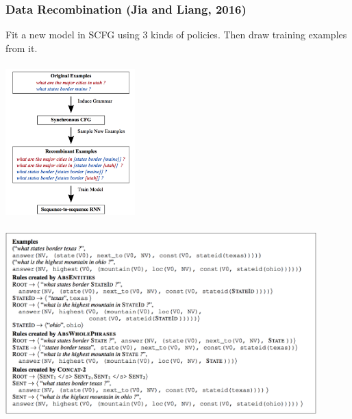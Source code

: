 \documentclass{beamer}
\begin{document}
\begin{frame}
    \frametitle{Data Recombination (Jia and Liang, 2016)}

     {
        Fit a new model in SCFG using 3 kinds of policies.
        Then draw training examples from it.

        \begin{center}
            \includegraphics[width=5cm,height=6cm]{img/data-recombinant-system.png}
        \end{center}
    }
     {
        \begin{center}
            \includegraphics[width=12cm,height=7cm]{img/data-recombinant-example.png}
        \end{center}
    }
\end{frame}
\end{document}
